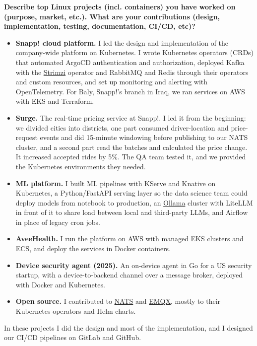 \noindent
\textbf{Describe top Linux projects (incl. containers) you have worked on (purpose, market, etc.).
What are your contributions (design, implementation, testing, documentation, CI/CD, etc)?}

\begin{itemize}
  \item \textbf{Snapp! cloud platform.} I led the design and implementation of the company-wide platform on Kubernetes. I wrote
    Kubernetes operators (CRDs) that automated ArgoCD authentication and authorization, deployed Kafka with the
    \href{https://strimzi.io/}{Strimzi} operator and RabbitMQ and Redis through their operators and custom resources, and set up monitoring
    and alerting with OpenTelemetry. For Baly, Snapp!'s branch in Iraq, we ran services on AWS with EKS and Terraform.
  \item \textbf{Surge.} The real-time pricing service at Snapp!. I led it from the beginning: we divided cities into districts, one part consumed
    driver-location and price-request events and did 15-minute windowing before publishing to our NATS cluster, and a second part read the batches
    and calculated the price change. It increased accepted rides by 5\%. The QA team tested it, and we provided the Kubernetes environments they needed.
  \item \textbf{ML platform.} I built ML pipelines with KServe and Knative on Kubernetes, a Python/FastAPI serving layer so the data science team could
    deploy models from notebook to production, an \href{https://ollama.com/}{Ollama} cluster with LiteLLM in front of it to share load between local
    and third-party LLMs, and Airflow in place of legacy cron jobs.
  \item \textbf{AveeHealth.} I run the platform on AWS with managed EKS clusters and ECS, and deploy the services in Docker containers.
  \item \textbf{Device security agent (2025).} An on-device agent in Go for a US security startup, with a device-to-backend channel over a message broker,
    deployed with Docker and Kubernetes.
  \item \textbf{Open source.} I contributed to \href{https://github.com/nats-io/}{NATS} and \href{https://github.com/emqx}{EMQX}, mostly to their
    Kubernetes operators and Helm charts.
\end{itemize}

In these projects I did the design and most of the implementation, and I designed our CI/CD pipelines on GitLab and GitHub.

